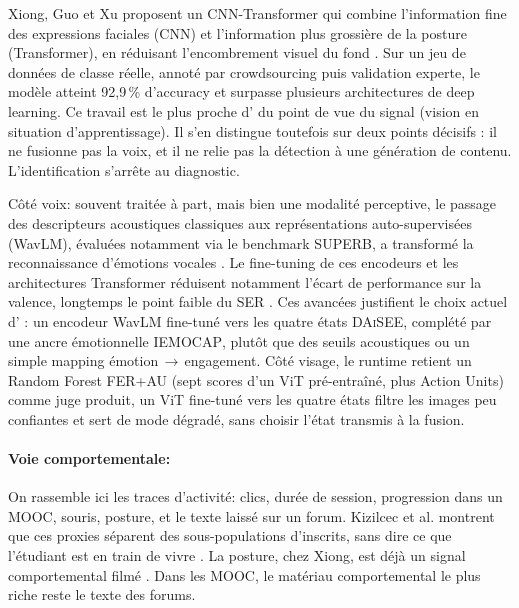 Xiong, Guo et Xu proposent un CNN-Transformer qui combine l'information
fine des expressions faciales (CNN) et l'information plus grossière de la
posture (Transformer), en réduisant l'encombrement visuel du fond
\cite{xiong2024cnntransformer}. Sur un jeu de données de classe réelle,
annoté par crowdsourcing puis validation experte, le modèle atteint
92,9\,\% d'accuracy et surpasse plusieurs architectures de deep learning.
Ce travail est le plus proche d'\emolearn{} du point de vue du
signal (vision en situation d'apprentissage). Il s'en distingue
toutefois sur deux points décisifs : il ne fusionne pas la voix, et il ne
relie pas la détection à une génération de contenu. L'identification
s'arrête au diagnostic.

Côté voix: souvent traitée à part, mais bien une modalité perceptive,
le passage des descripteurs acoustiques classiques aux représentations
auto-supervisées (WavLM), évaluées notamment via le
benchmark SUPERB, a transformé la reconnaissance
d'émotions vocales
\cite{chen2022wavlm,pepino2021emotion,yang2021superb,latif2023survey}.
Le fine-tuning de ces encodeurs \cite{chen2023exploring} et les
architectures Transformer réduisent notamment l'écart de performance
sur la valence, longtemps le point faible du SER
\cite{wagner2023dawn}. Ces avancées justifient le choix actuel
d'\emolearn{} : un encodeur WavLM fine-tuné vers les quatre
états \textsc{DAiSEE}, complété par une ancre émotionnelle
\textsc{IEMOCAP}, plutôt que des seuils acoustiques ou un simple mapping
émotion\,$\rightarrow$\,engagement. Côté visage, le runtime retient un
Random Forest FER+AU (sept scores d'un ViT pré-entraîné, plus
Action Units) comme juge produit, un ViT fine-tuné vers les quatre
états filtre les images peu confiantes et sert de mode dégradé, sans
choisir l'état transmis à la fusion.

\paragraph{Voie comportementale:}
On rassemble ici les traces d'activité: clics, durée de session,
progression dans un MOOC, souris, posture, et le texte laissé sur un forum.
Kizilcec et al. montrent que ces proxies séparent des
sous-populations d'inscrits, sans dire ce que l'étudiant est en train de
vivre \cite{kizilcec2013deconstructing}. La posture, chez Xiong, est déjà
un signal comportemental filmé \cite{xiong2024cnntransformer}. Dans les
MOOC, le matériau comportemental le plus riche reste le texte des
forums.

